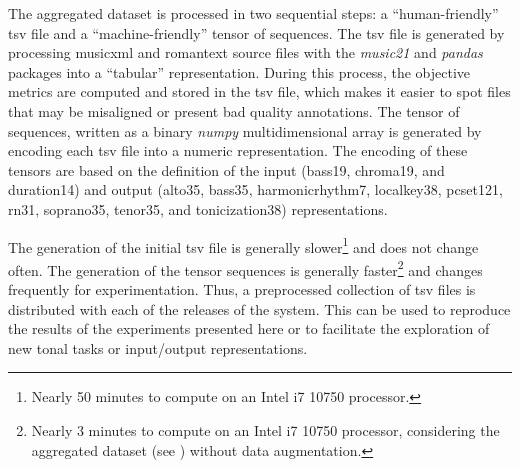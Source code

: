
The aggregated dataset is processed in two sequential steps:
a ``human-friendly'' \gls{tsv} file and a
``machine-friendly'' tensor of sequences. The \gls{tsv} file
is generated by processing \gls{musicxml} and
\gls{romantext} source files with the \emph{music21}
\parencite{cuthbert2010music21} and \emph{pandas}
\parencite{mckinney2011pandas} packages into a ``tabular''
representation. During this process, the objective metrics
are computed and stored in the \gls{tsv} file, which makes
it easier to spot files that may be misaligned or present
bad quality annotations. The tensor of sequences, written as
a binary \emph{numpy} \parencite{oliphant2006guide}
multidimensional array is generated by encoding each
\gls{tsv} file into a numeric representation. The encoding
of these tensors are based on the definition of the input
(\gls{bass19}, \gls{chroma19}, and \gls{duration14}) and
output (\gls{alto35}, \gls{bass35}, \gls{harmonicrhythm7},
\gls{localkey38}, \gls{pcset121}, \gls{rn31},
\gls{soprano35}, \gls{tenor35}, and \gls{tonicization38})
representations.

The generation of the initial \gls{tsv} file is generally
slower\footnote{Nearly 50 minutes to compute on an Intel i7
10750 processor.} and does not change often. The generation
of the tensor sequences is generally faster\footnote{Nearly
3 minutes to compute on an Intel i7 10750 processor,
considering the aggregated dataset (see
) without data augmentation.}
and changes frequently for experimentation. Thus, a
preprocessed collection of \gls{tsv} files is distributed
with each of the releases of the system. This can be used to
reproduce the results of the experiments presented here or
to facilitate the exploration of new tonal tasks or
input/output representations.
